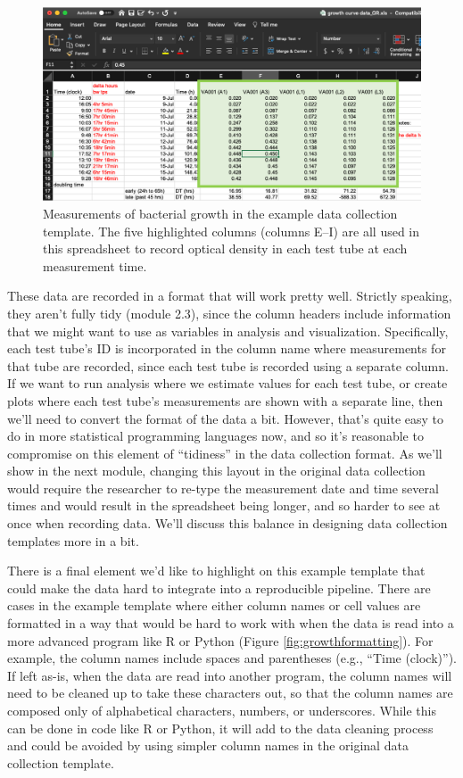 \documentclass[]{tufte-book}
\begin{document}
\begin{figure}
\includegraphics[width=\textwidth]{figures/growth_curve_growth_measures} \caption[Measurements of bacterial growth in the example data collection template]{Measurements of bacterial growth in the example data collection template. The five highlighted columns (columns E--I) are all used in this spreadsheet to record optical density in each test tube at each measurement time.}\label{fig:growthmeasures}
\end{figure}

These data are recorded in a format that will work pretty well. Strictly
speaking, they aren't fully tidy (module 2.3), since the column headers include
information that we might want to use as variables in analysis and
visualization. Specifically, each test tube's ID is incorporated in the column
name where measurements for that tube are recorded, since each test tube is
recorded using a separate column. If we want to run analysis where we estimate
values for each test tube, or create plots where each test tube's measurements
are shown with a separate line, then we'll need to convert the format of the
data a bit. However, that's quite easy to do in more statistical programming
languages now, and so it's reasonable to compromise on this element of
``tidiness'' in the data collection format. As we'll show in the next module,
changing this layout in the original data collection would require the
researcher to re-type the measurement date and time several times and would
result in the spreadsheet being longer, and so harder to see at once when
recording data. We'll discuss this balance in designing data collection
templates more in a bit.

There is a final element we'd like to highlight on this example template that
could make the data hard to integrate into a reproducible pipeline. There are
cases in the example template where either column names or cell values are
formatted in a way that would be hard to work with when the data is read into a
more advanced program like R or Python (Figure \ref{fig:growthformatting}). For
example, the column names include spaces and parentheses (e.g., ``Time (clock)'').
If left as-is, when the data are read into another program, the column names
will need to be cleaned up to take these characters out, so that the column
names are composed only of alphabetical characters, numbers, or underscores.
While this can be done in code like R or Python, it will add to the data
cleaning process and could be avoided by using simpler column names in the
original data collection template.
\end{document}
